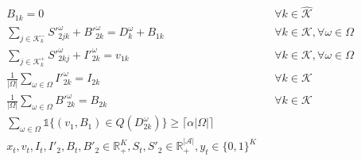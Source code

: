 \documentclass[11pt]{article}
\newcommand{\ti}{t} %
\newcommand{\TI}{\mathcal{T}}
\newcommand{\ka}{k} %
\newcommand{\KA}{\mathcal{K}}
\newcommand{\Ka}{K}
\newcommand{\jey}{j} %
\newcommand{\Graf}{\mathcal{A}} %
\newcommand{\Bi}{B} %
\newcommand{\Vi}{v} %
\newcommand{\m}{\omega} %
\newcommand{\Em}{|\Omega|} %
\newcommand{\EM}{\Omega} %
\newcommand{\Csub}{\mathcal{K}^+_k}
\newcommand{\Psub}{\mathcal{K}^-_k}
\newcommand{\cred}{\color{black}}
\begin{document}
\begin{subequations}
\begin{alignat}{2}
&\Bi_{1 \ka} =0 &&\forall  \ka \in \hat{\KA} \label{eq:Backlog_determination_CC}\\
 &  \sum_{\jey \in  \Psub} {S}'^{\m}_{2 \jey \ka} + B'^{\m}_{2  \ka }  = D^ {\m}_{\ka} + {B}_{1  \ka} &&\forall \ka \in \KA, \forall \m \in \EM     \label{eq:Det_backorder_tnp} \\
&  \sum_{\jey \in  \Csub} {S}'^{\m}_{2 \ka \jey} + I'^{\m}_{2  \ka} = v_{1  \ka} &&\forall \ka \in \KA, \forall \m \in \EM       \label{eq:Det_inventory_tnp}\\
& \frac{1}{\Em} \sum_{\m \in \EM} I'^{\m}_{2 \ka } = I_{2 \ka} &&\forall \ka \in \KA  \label{eq:Average_Inventory} \\
& \frac{1}{\Em} \sum_{\m \in \EM} B'^{\m}_{2 \ka} = B_{2 \ka} &&\forall \ka \in \KA  \label{eq:Average_Backlog}\\
& \sum_ {\m \in \EM}  \mathds{1} {\{ ({\Vi}_{1}, {\Bi}_{1} ) \in Q(D^ {\m}_{2\ka} ) \}} \geq \lceil \alpha |\EM|  \rceil \label{eq:chance_ServiceLevel}\\
&{x}_{ \ti },  {v}_{ \ti },  {I}_{ \ti} , {I}'_{ 2} , {\Bi}_{ \ti } , {\Bi}'_{ 2 } \in \mathbb{R}_{+}^{\Ka} , {S}_{\ti}, {S}'_{2} \in \mathbb{R}_{+}^{|\Graf|} ,{y}_{ \ti } \in \{0,1\}^{\Ka} \label{eq:Sub_FD_bound3}
\end{alignat}

  \end{subequations}
  
\end{document}
